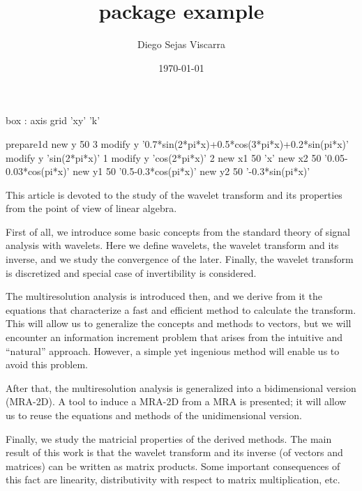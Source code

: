 \documentclass[letterpaper,10pt]{article}
\title{\mglTeX{} package example}
\author{Diego Sejas Viscarra}
\date{\today}
\begin{document}
  \begin{mglsetup}[2d]
    box : axis
    grid 'xy' 'k'
  \end{mglsetup}
  
  \maketitle
  
  \begin{mglfunc}{prepare1d}
    new y 50 3
    modify y '0.7*sin(2*pi*x)+0.5*cos(3*pi*x)+0.2*sin(pi*x)'
    modify y 'sin(2*pi*x)' 1
    modify y 'cos(2*pi*x)' 2
    new x1 50 'x'
    new x2 50 '0.05-0.03*cos(pi*x)'
    new y1 50 '0.5-0.3*cos(pi*x)'
    new y2 50 '-0.3*sin(pi*x)'
  \end{mglfunc}
  
  \noindent This article is devoted to the study of the wavelet transform and its properties from the point of view of linear algebra.
  
  First of all, we introduce some basic concepts from the standard theory of signal analysis with wavelets. Here we define wavelets, the wavelet transform and its inverse, and we study the convergence of the later. Finally, the wavelet transform is discretized and special case of invertibility is considered.
  
  The multiresolution analysis is introduced then, and we derive from it the equations that characterize a fast and efficient method to calculate the transform. This will allow us to generalize the concepts and methods to vectors, but we will encounter an information increment problem that arises from the intuitive and ``natural'' approach. However, a simple yet ingenious method will enable us to avoid this problem.
  
  After that, the multiresolution analysis is generalized into a bidimensional version (MRA-2D). A tool to induce a MRA-2D from a MRA is presented; it will allow us to reuse the equations and methods of the unidimensional version.
  
  Finally, we study the matricial properties of the derived methods. The main result of this work is that the wavelet transform and its inverse (of vectors and matrices) can be written as matrix products. Some important consequences of this fact are linearity, distributivity with respect to matrix multiplication, etc.
  
\end{document}
